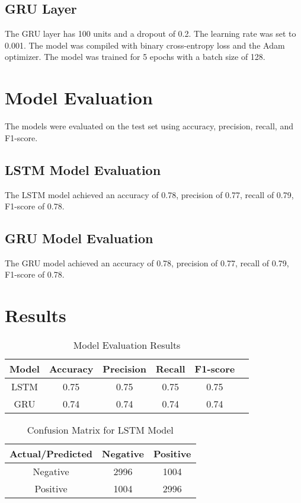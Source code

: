 \documentclass{article}
\begin{document}
\subsection{GRU Layer}
The GRU layer has 100 units and a dropout of 0.2. The learning rate was set to 0.001. The model was compiled with binary cross-entropy loss and the Adam optimizer. The model was trained for 5 epochs with a batch size of 128.

\section{Model Evaluation}
The models were evaluated on the test set using accuracy, precision, recall, and F1-score.

\subsection{LSTM Model Evaluation}
The LSTM model achieved an accuracy of 0.78, precision of 0.77, recall of 0.79, F1-score of 0.78.

\subsection{GRU Model Evaluation}
The GRU model achieved an accuracy of 0.78, precision of 0.77, recall of 0.79, F1-score of 0.78.

\section{Results}
\begin{table}[!htb]
    \centering
    \begin{tabular}{|c|c|c|c|c|c|}
        \hline
        \textbf{Model} & \textbf{Accuracy} & \textbf{Precision} & \textbf{Recall} & \textbf{F1-score} \\
        \hline
        LSTM           & 0.75              & 0.75               & 0.75            & 0.75              \\
        GRU            & 0.74              & 0.74               & 0.74            & 0.74              \\
        \hline
    \end{tabular}
    \caption{Model Evaluation Results}
    \label{tab:results}
\end{table}

\begin{table}[!htb]
    \centering
    \begin{tabular}{|c|c|c|}
        \hline
        \textbf{Actual/Predicted} & \textbf{Negative} & \textbf{Positive} \\
        \hline
        Negative                  & 2996              & 1004              \\
        Positive                  & 1004              & 2996              \\
        \hline
    \end{tabular}
    \caption{Confusion Matrix for LSTM Model}
    \label{tab:confusion_lstm}
\end{table}
\end{document}
